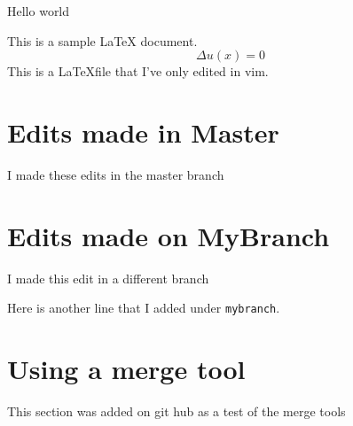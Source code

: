 \documentclass[11pt,letterpaper]{article}
\begin{document}
	
	Hello world
	
	This is a sample LaTeX document.
	\begin{equation} \Delta u(x)=0\end{equation}
	This is a \LaTeX file that I've only edited in vim.	
	
	\section{Edits made in Master}
	I made these edits in the master branch

	\section{Edits made on MyBranch}
	I made this edit in a different branch

	Here is another line that I added under \verb|mybranch|. 
	
	\section{Using a merge tool}
	This section was added on git hub as a test of the merge tools
\end{document}
